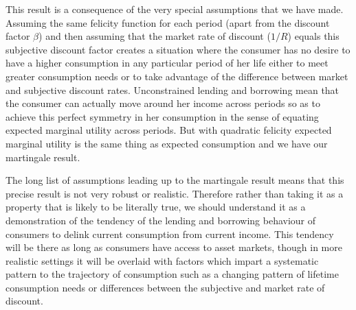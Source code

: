 \documentclass[12pt,reqno]{amsart}
\begin{document}
This result is a consequence of the very special
assumptions that we have made. Assuming the same felicity function for
each period (apart from the discount factor $\beta$) and then assuming that
the market rate of discount ($1/R$) equals this subjective discount factor
creates a situation where the consumer has no desire to have a higher
consumption in any particular period of her life either to meet
greater consumption needs or to take advantage of the difference
between market and subjective discount rates. Unconstrained lending
and borrowing mean that the consumer can actually move around her
income across periods so as to achieve this perfect symmetry in her
consumption in the sense of equating expected marginal utility across
periods. But with quadratic felicity expected marginal utility is the
same thing as expected consumption and we have our martingale result.

The long list of assumptions leading up to the martingale result means
that this precise result is not very robust or realistic. Therefore
rather than taking it as a property that is likely to be literally
true, we should understand it as a demonstration of the tendency of
the lending and borrowing behaviour of consumers to delink current
consumption from current income. This tendency will be there as long
as consumers have access to asset markets, though in more realistic
settings it will be overlaid with factors which impart a systematic
pattern to the trajectory of consumption such as a changing pattern of
lifetime consumption needs or differences between the subjective and
market rate of discount.
\end{document}
